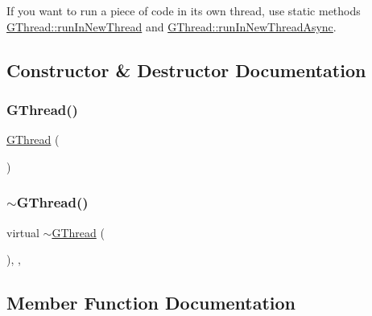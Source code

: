 If you want to run a piece of code in its own thread, use static methods {\ttfamily \mbox{\hyperlink{classGThread_ad70a32318f3f0a9cf25582379c6d7ffb}{G\+Thread\+::run\+In\+New\+Thread}}} and {\ttfamily \mbox{\hyperlink{classGThread_aee1af0236d033fce36073899bb4368ed}{G\+Thread\+::run\+In\+New\+Thread\+Async}}}. 

\subsection{Constructor \& Destructor Documentation}
\mbox{\label{classGThread_a7db4904140090c18f864e09283f2b529}} 
\subsubsection{\texorpdfstring{G\+Thread()}{GThread()}}
{\footnotesize\ttfamily \mbox{\hyperlink{classGThread}{G\+Thread}} (\begin{DoxyParamCaption}{ }\end{DoxyParamCaption})\hspace{0.3cm}{\ttfamily [protected]}}

\mbox{\label{classGThread_ae4f0a2859df75533269d8916c361855d}} 
\subsubsection{\texorpdfstring{$\sim$\+G\+Thread()}{~GThread()}}
{\footnotesize\ttfamily virtual $\sim$\mbox{\hyperlink{classGThread}{G\+Thread}} (\begin{DoxyParamCaption}{ }\end{DoxyParamCaption})\hspace{0.3cm}{\ttfamily [protected]}, {\ttfamily [virtual]}, {\ttfamily [default]}}



\subsection{Member Function Documentation}
\mbox{\label{classGThread_a27a1f5f9657637e4a4b6a7127ca9da33}} 
